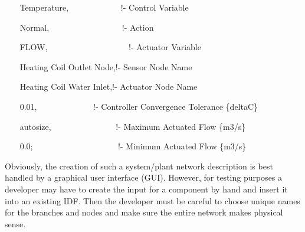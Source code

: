 ~~~ Temperature,~~~~~~~~~~~~ !- Control Variable

~~~ Normal,~~~~~~~~~~~~~~~~~ !- Action

~~~ FLOW,~~~~~~~~~~~~~~~~~~~ !- Actuator Variable

~~~ Heating Coil Outlet Node,!- Sensor Node Name

~~~ Heating Coil Water Inlet,!- Actuator Node Name

~~~ 0.01,~~~~~~~~~~~~~ !- Controller Convergence Tolerance \{deltaC\}

~~~ autosize,~~~~~~~~~~~~~~~ !- Maximum Actuated Flow \{m3/s\}

~~~ 0.0;~~~~~~~~~~~~~~~~~~~~ !- Minimum Actuated Flow \{m3/s\}

Obviously, the creation of such a system/plant network description is best handled by a graphical user interface (GUI). However, for testing purposes a developer may have to create the input for a component by hand and insert it into an existing IDF. Then the developer must be careful to choose unique names for the branches and nodes and make sure the entire network makes physical sense.
